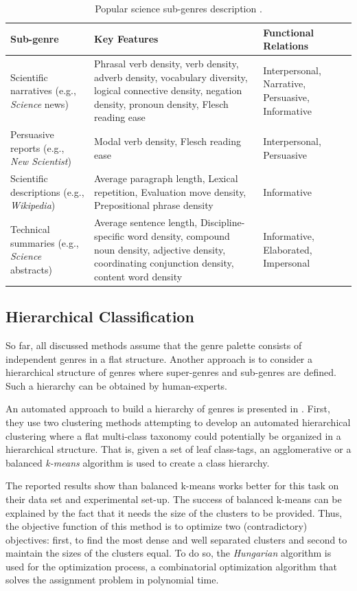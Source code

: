 \begin{table}[t]
	\center
	\caption {Popular science sub-genres description \parencite{lieungnapar2017genre}.}\label{chap:relevant_work:tbl:pop_science_registers_features}
	\begin{tabular}{p{3.5cm}p{7cm}p{2cm}}
		\hline
		Sub-genre & Key Features & Functional Relations \\
		\hline
		 Scientific narratives (e.g., \textit{Science} news) & Phrasal verb density, verb density, adverb density, vocabulary diversity, logical connective density, negation density, pronoun density, Flesch reading ease & Interpersonal, Narrative, Persuasive, Informative \\
         Persuasive reports (e.g., \textit{New Scientist}) & Modal verb density, Flesch reading ease & Interpersonal, Persuasive \\
         Scientific descriptions (e.g., \textit{Wikipedia}) & Average paragraph length, Lexical repetition, Evaluation move density, Prepositional phrase density & Informative\\
         Technical summaries (e.g., \textit{Science} abstracts)  & Average sentence length, Discipline-specific word density, compound noun density, adjective density, coordinating conjunction density, content word density & Informative, Elaborated, Impersonal  \\
  		\hline
	\end{tabular}
\end{table}

\subsection{Hierarchical Classification} 

So far, all discussed methods assume that the genre palette consists of independent genres in a flat structure. Another approach is to consider a hierarchical structure of genres where super-genres and sub-genres are defined. Such a hierarchy can be obtained by human-experts.

An automated approach to build a hierarchy of genres is presented in \parencite{madjarov2015web}. First, they use two clustering methods attempting to develop an automated hierarchical clustering where a flat multi-class taxonomy could potentially be organized in a hierarchical structure. That is, given a set of  leaf class-tags, an agglomerative or a balanced \textit{k-means} algorithm is used to create a class hierarchy. 

The reported results show than balanced k-means works better for this task on their data set and experimental set-up. The success of balanced k-means can be explained by the fact that it needs the size of the clusters to be provided. Thus, the objective function of this method is to optimize two (contradictory) objectives: first, to find the most dense and well separated clusters and second to maintain the sizes of the clusters equal. To do so, the \textit{Hungarian} algorithm is used for the optimization process, a combinatorial optimization algorithm that solves the assignment problem in polynomial time.

